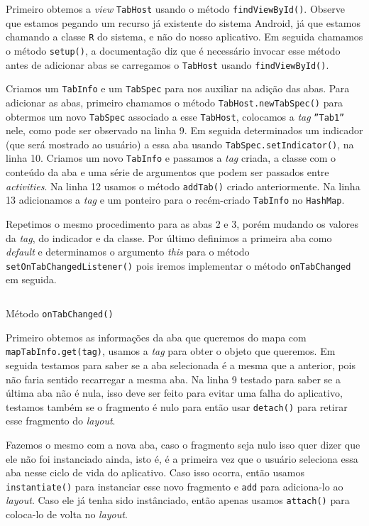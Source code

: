 \documentclass[a4paper,12pt,brazil]{book}
\begin{document}
\begin{singlespace}
	Primeiro obtemos a \emph{view} \texttt{TabHost} usando o método \texttt{findViewById()}. Observe que estamos pegando um recurso já existente do sistema Android, já que estamos chamando a classe \texttt{R} do sistema, e não do nosso aplicativo. Em seguida chamamos o método \texttt{setup()}, a documentação diz que é necessário invocar esse método antes de adicionar abas se carregamos o \texttt{TabHost} usando \texttt{findViewById()}.
	
	Criamos um \texttt{TabInfo} e um \texttt{TabSpec} para nos auxiliar na adição das abas. Para adicionar as abas, primeiro chamamos o método \texttt{TabHost.newTabSpec()} para obtermos um novo \texttt{TabSpec} associado a esse \texttt{TabHost}, colocamos a \emph{tag} \texttt{''Tab1''} nele, como pode ser observado na linha 9. Em seguida determinados um indicador (que será mostrado ao usuário) a essa aba usando \texttt{TabSpec.setIndicator()}, na linha 10. Criamos um novo \texttt{TabInfo} e passamos a \emph{tag} criada, a classe com o conteúdo da aba e uma série de argumentos que podem ser passados entre \emph{activities}. Na linha 12 usamos o método \texttt{addTab()} criado anteriormente. Na linha 13 adicionamos a \emph{tag} e um ponteiro para o recém-criado \texttt{TabInfo} no \texttt{HashMap}.
	
	Repetimos o mesmo procedimento para as abas 2 e 3, porém mudando os valores da \emph{tag}, do indicador e da classe. Por último definimos a primeira aba como \emph{default} e determinamos o argumento \emph{this} para o método \texttt{setOnTabChangedListener()} pois iremos implementar o método \texttt{onTabChanged} em seguida.
	
	\begin{listing}[H]
	\inputminted[linenos=true,fontsize=\small,frame=lines, framesep=2mm, tabsize=2,numbersep=5pt]{java}{src/design/ontabchanged.java}
	\caption{Método \texttt{onTabChanged()}}
	\end{listing}
	
	Primeiro obtemos as informações da aba que queremos do mapa com \texttt{mapTabInfo.get(tag)}, usamos a \emph{tag} para obter o objeto que queremos. Em seguida testamos para saber se a aba selecionada é a mesma que a anterior, pois não faria sentido recarregar a mesma aba. Na linha 9 testado para saber se a última aba não é nula, isso deve ser feito para evitar uma falha do aplicativo, testamos também se o fragmento é nulo para então usar \texttt{detach()} para retirar esse fragmento do \emph{layout}. 
	
	Fazemos o mesmo com a nova aba, caso o fragmento seja nulo isso quer dizer que ele não foi instanciado ainda, isto é, é a primeira vez que o usuário seleciona essa aba nesse ciclo de vida do aplicativo. Caso isso ocorra, então usamos \texttt{instantiate()} para instanciar esse novo fragmento e \texttt{add} para adiciona-lo ao \emph{layout}. Caso ele já tenha sido instânciado, então apenas usamos \texttt{attach()} para coloca-lo de volta no \emph{layout}.
	

\end{singlespace}
\end{document}
